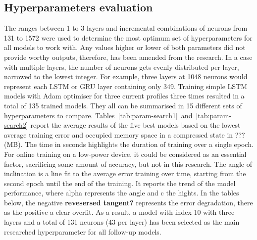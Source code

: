 %
%
\subsection{Hyperparameters evaluation}
The ranges between 1 to 3 layers and incremental combinations of neurons from 131 to 1572 were used to determine the most optimum set of hyperparameters for all models to work with.
Any values higher or lower of both parameters did not provide worthy outputs, therefore, has been amended from the research.
In a case with multiple layers, the number of neurons gets evenly distributed per layer, narrowed to the lowest integer.
For example, three layers at 1048 neurons would represent each LSTM or GRU layer containing only 349.
Training simple LSTM models with Adam optimiser for three current profiles three times resulted in a total of 135 trained models.
They all can be summarised in 15 different sets of hyperparameters to compare.
\mbox{Tables~\ref{tab:param-search1} and~\ref{tab:param-search2}} report the average results of the five best models based on the lowest average training error and occupied memory space in a compressed state in ??? (MB).
The time in seconds highlights the duration of training over a single epoch.
For online training on a low-power device, it could be considered as an essential factor, sacrificing some amount of accuracy, but not in this research.
The angle of inclination is a line fit to the average error training over time, starting from the second epoch until the end of the training.
It reports the trend of the model performance, where alpha represents the angle and c the hights.
In the tables below, the negative \textbf{revesersed tangent?} represents the error degradation, there as the positive a clear overfit.
As a result, a model with index 10 with three layers and a total of 131 neurons (43 per layer) has been selected as the main researched hyperparameter for all follow-up models.
